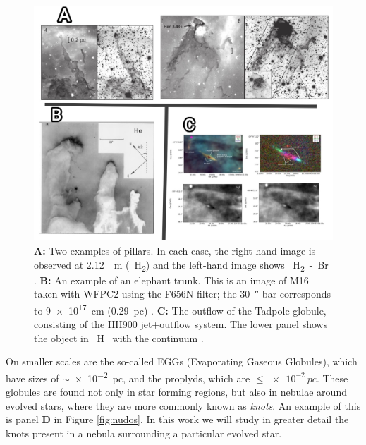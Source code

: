 \documentclass{book}
\begin{document}
\begin{figure}[htb]
    \centering
    \includegraphics[width=1 \textwidth]{images Chapter 1/C1_Pillars.jpg}
    \caption{\textbf{A:} Two examples of pillars. In each case, the
      right-hand image is observed at \SI{2.12}{\mu m} (\SI{}{H_2})
      and the left-hand image shows \SI{}{H_2-Br_{\gamma}}
      \citep{Hartigan:2015}. \textbf{B:} An example of an elephant
      trunk. This is an image of M16 taken with WFPC2 using the F656N
      filter; the \SI{30}{\arcsecond} bar corresponds to
      \SI{9e17}{cm} (\SI{0.29}{pc}) \citep{JJHester:1996}. \textbf{C:}
      The outflow of the Tadpole globule, consisting of the HH900
      jet+outflow system. The lower panel shows the object in
      \SI{}{H\alpha} with the continuum \citep{MeganReiter:2019}.}
    \label{fig:Pillars}
\end{figure}

On smaller scales are the so-called EGGs (Evaporating Gaseous
Globules), which have sizes of $\sim$\SI{e-2}{pc}, and the proplyds,
which are $\le\SI{e-2}{pc}$. These globules are found not only in star
forming regions, but also in nebulae around evolved stars, where they
are more commonly known as \textit{knots}. An example of this is panel
\textbf{D} in Figure \ref{fig:nudos}. In this work we will study in
greater detail the knots present in a nebula surrounding a particular
evolved star.
\end{document}
